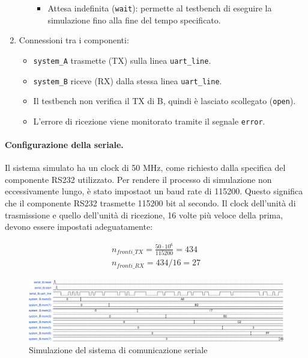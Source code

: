 \begin{enumerate}
\begin{itemize}
\begin{itemize}
            \item Attesa indefinita (\texttt{wait}): permette al testbench di eseguire la simulazione fino alla fine del tempo specificato.
        \end{itemize}
    \end{itemize}
    \item Connessioni tra i componenti:
    \begin{itemize}
        \item \texttt{system\_A} trasmette (TX) sulla linea \texttt{uart\_line}.
        \item \texttt{system\_B} riceve (RX) dalla stessa linea \texttt{uart\_line}.
        \item Il testbench non verifica il TX di B, quindi è lasciato scollegato (\texttt{open}).
        \item L'errore di ricezione viene monitorato tramite il segnale \texttt{error}.
    \end{itemize}
\end{enumerate}

\paragraph{Configurazione della seriale.} Il sistema simulato ha un clock di 50 MHz, come richiesto dalla specifica del componente RS232 utilizzato. Per rendere il processo di simulazione non eccessivamente lungo, è stato impostaot un baud rate di 115200. Questo significa che il componente RS232 trasmette 115200 bit al secondo. Il clock dell'unità di trasmissione e quello dell'unità di ricezione, 16 volte più veloce della prima, devono essere impostati adeguatamente:

\begin{align*}
    n_{fronti\_TX} = \frac{50 \cdot 10^6}{115200} = 434 \\
    n_{fronti\_RX} = 434 / 16 = 27
\end{align*}

\begin{figure}[h]
    \centering
    \includegraphics[width=\linewidth]{img/serial_tb.pdf}
    \caption{Simulazione del sistema di comunicazione seriale}
    \label{fig:serial_tb}
\end{figure}

